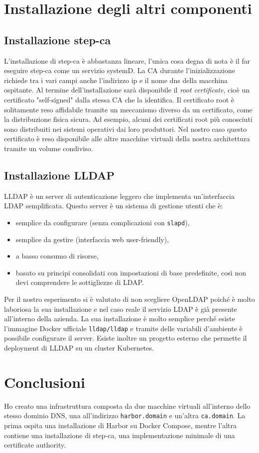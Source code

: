\documentclass[12pt,a4paper]{report}
\begin{document}
\chapter{Installazione degli altri componenti}
\section{Installazione step-ca}
L'installazione di step-ca è abbastanza lineare, l'unica cosa degna di nota è il far eseguire step-ca come un servizio systemD. La CA durante l'inizializzazione richiede tra i vari campi anche l'indirizzo ip e il nome dns della macchina ospitante. Al termine dell'installazione sarà disponibile il \textit{root certificate}, cioè un certificato "self-signed" dalla stessa CA che la identifica. Il certificato root è solitamente reso affidabile tramite un meccanismo diverso da un certificato, come la distribuzione fisica sicura. Ad esempio, alcuni dei certificati root più conosciuti sono distribuiti nei sistemi operativi dai loro produttori.
Nel nostro caso questo certificato è reso disponibile alle altre macchine virtuali della nostra architettura tramite un volume condiviso.

\section{Installazione LLDAP}
LLDAP è un server di autenticazione leggero che implementa un'interfaccia LDAP semplificata. Questo server è un sistema di gestione utenti che è:
\begin{itemize}
    \item semplice da configurare (senza complicazioni con \texttt{slapd}),
    \item semplice da gestire (interfaccia web user-friendly),
    \item a basso consumo di risorse,
    \item basato su principi consolidati con impostazioni di base predefinite, così non devi comprendere le sottigliezze di LDAP.
\end{itemize}
Per il nostro esperimento si è valutato di non scegliere OpenLDAP poiché è molto laboriosa la sua installazione e nel caso reale il servizio LDAP è già presente all'interno della azienda.
La sua installazione è molto semplice perché esiste l'immagine Docker ufficiale \texttt{lldap/lldap} e tramite delle variabili d'ambiente è possibile configurare il server.
Esiste inoltre un progetto esterno che permette il deployment di LLDAP su un cluster Kubernetes. 

\chapter{Conclusioni}
Ho creato una infrastruttura composta da due macchine virtuali all'interno dello stesso dominio DNS, una all'indirizzo \texttt{harbor.domain} e un'altra \texttt{ca.domain}. La prima ospita una installazione di Harbor su Docker Compose, mentre l'altra contiene una installazione di step-ca, una implementazione minimale di una certificate authority. 
\end{document}
